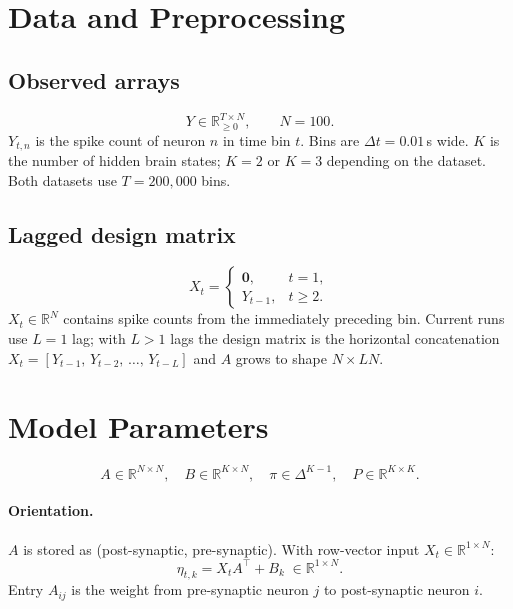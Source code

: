 \documentclass[11pt]{article}
\begin{document}
\section{Data and Preprocessing}

\subsection{Observed arrays}
\begin{equation}
  Y\in\mathbb{R}_{\ge 0}^{T\times N},\qquad N=100.
\end{equation}
$Y_{t,n}$ is the spike count of neuron $n$ in time bin $t$.  Bins are
$\Delta t = 0.01$\,s wide.  $K$ is the number of hidden brain states; $K=2$ or
$K=3$ depending on the dataset.  Both datasets use $T = 200{,}000$ bins.

\subsection{Lagged design matrix}
\begin{equation}
  X_t =
  \begin{cases}
    \mathbf{0}, & t = 1,\\
    Y_{t-1},    & t \ge 2.
  \end{cases}
\end{equation}
$X_t\in\mathbb{R}^N$ contains spike counts from the immediately preceding bin.
Current runs use $L=1$ lag; with $L>1$ lags the design matrix is the horizontal
concatenation $X_t = [Y_{t-1},\,Y_{t-2},\,\ldots,\,Y_{t-L}]$ and $A$ grows to
shape $N\times LN$.

\section{Model Parameters}

\begin{equation}
  A\in\mathbb{R}^{N\times N},\quad
  B\in\mathbb{R}^{K\times N},\quad
  \pi\in\Delta^{K-1},\quad
  P\in\mathbb{R}^{K\times K}.
\end{equation}

\paragraph{Orientation.}
$A$ is stored as (post-synaptic, pre-synaptic).  With row-vector input
$X_t\in\mathbb{R}^{1\times N}$:
\begin{equation}
  \eta_{t,k} = X_t A^\top + B_k \;\in\mathbb{R}^{1\times N}.
\end{equation}
Entry $A_{ij}$ is the weight from pre-synaptic neuron $j$ to post-synaptic neuron $i$.
\end{document}
